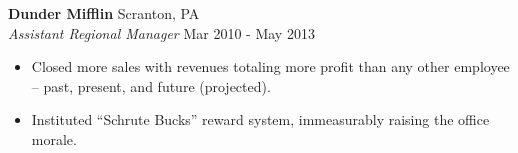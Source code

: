 \textbf{Dunder Mifflin} \hfill Scranton, PA\\
\textit{Assistant Regional Manager} \hfill Mar 2010 - May 2013\\
\vspace{-1mm}
\begin{itemize} \itemsep 1pt
	\item Closed more sales with revenues totaling more profit than any other employee – past, present, and future (projected).
	\item Instituted “Schrute Bucks” reward system, immeasurably raising the office morale.
\end{itemize}